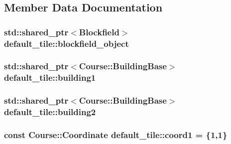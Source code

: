 \subsection{Member Data Documentation}
\hypertarget{classdefault__tile_a475f12ebc676bc8252ccea358329eb55}{
\subsubsection[{blockfield\-\_\-object}]{\setlength{\rightskip}{0pt plus 5cm}std\-::shared\-\_\-ptr$<${\bf Blockfield}$>$ default\-\_\-tile\-::blockfield\-\_\-object\hspace{0.3cm}{\ttfamily [private]}}}\label{classdefault__tile_a475f12ebc676bc8252ccea358329eb55}
\hypertarget{classdefault__tile_a1428f399558ca156afbc754ae04fe6d0}{
\subsubsection[{building1}]{\setlength{\rightskip}{0pt plus 5cm}std\-::shared\-\_\-ptr$<${\bf Course\-::\-Building\-Base}$>$ default\-\_\-tile\-::building1\hspace{0.3cm}{\ttfamily [private]}}}\label{classdefault__tile_a1428f399558ca156afbc754ae04fe6d0}
\hypertarget{classdefault__tile_a6cff7bada2d7f8f055225d1442fc0d6d}{
\subsubsection[{building2}]{\setlength{\rightskip}{0pt plus 5cm}std\-::shared\-\_\-ptr$<${\bf Course\-::\-Building\-Base}$>$ default\-\_\-tile\-::building2\hspace{0.3cm}{\ttfamily [private]}}}\label{classdefault__tile_a6cff7bada2d7f8f055225d1442fc0d6d}
\hypertarget{classdefault__tile_ad881db4d38fb6ce5f6344fd13ad35fc1}{
\subsubsection[{coord1}]{\setlength{\rightskip}{0pt plus 5cm}const {\bf Course\-::\-Coordinate} default\-\_\-tile\-::coord1 = \{1,1\}\hspace{0.3cm}{\ttfamily [private]}}}\label{classdefault__tile_ad881db4d38fb6ce5f6344fd13ad35fc1}
